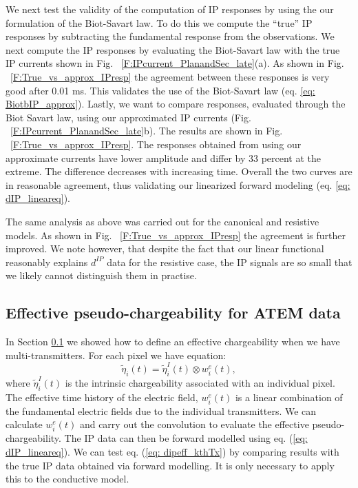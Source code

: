 \documentclass[extra,mreferee]{gji}
\newcommand{\peta}{\tilde{\eta}}
\newcommand{\dip}{d^{IP}}
\begin{document}
We next test the validity of the computation of IP responses by using the our formulation of the Biot-Savart law. To do this we compute the ``true'' IP responses  by subtracting the fundamental response from the observations. We next compute the IP responses by evaluating the Biot-Savart law with the true IP currents shown in Fig. ~\ref{F:IPcurrent_PlanandSec_late}(a). As shown in Fig. ~\ref{F:True_vs_approx_IPresp} the agreement between these responses is very good after 0.01 ms. This validates the use of the Biot-Savart law (eq. \ref{eq: BiotbIP_approx}). Lastly, we want to compare responses, evaluated through the Biot Savart law, using our approximated IP currents (Fig. ~\ref{F:IPcurrent_PlanandSec_late}b). The results are shown in Fig. ~\ref{F:True_vs_approx_IPresp}. The responses obtained from using our approximate currents have lower amplitude and differ by 33 percent at the extreme. The difference decreases with increasing time. Overall the two curves are in reasonable agreement, thus validating our linearized forward modeling (eq. \ref{eq: dIP_lineareq}).

The same analysis as above was carried out for the canonical and resistive models. As shown in  Fig. ~\ref{F:True_vs_approx_IPresp} the agreement is further improved. We note however, that despite the fact that our linear functional reasonably explains $\dip$ data for the resistive case, the IP signals are so small that we likely cannot distinguish them in practise.

\subsection{Effective pseudo-chargeability for ATEM data}
\label{subsection: Effective pseudo-chargeability for ATEM data}

In Section \ref{subsection: Effective pseudo-chargeability for ATEM data} we showed how to define an effective chargeability when we have multi-transmitters. For each pixel we have
equation: 
\begin{equation}
  \peta_i(t) = \peta_i^I(t) \otimes  w_i^e(t),
\end{equation}
where $\peta_i^I(t)$ is the intrinsic chargeability associated with an individual pixel. The effective time history of the electric field, $w_i^e(t)$ is a linear combination of the fundamental electric fields due to the individual transmitters. We can calculate $w_i^e(t)$ and carry out the convolution to evaluate the effective pseudo-chargeability. The IP data can then be forward modelled using eq. (\ref{eq: dIP_lineareq}). We can test eq. (\ref{eq: dipeff_kthTx}) by comparing results with the true IP data obtained via forward modelling. It is only necessary to apply this to the conductive model. 
\end{document}
